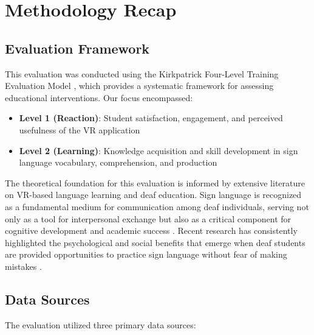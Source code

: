\documentclass[12pt,a4paper]{article}
\begin{document}
\section{Methodology Recap}

\subsection{Evaluation Framework}

This evaluation was conducted using the Kirkpatrick Four-Level Training Evaluation Model \citep{xie2022virtual}, which provides a systematic framework for assessing educational interventions. Our focus encompassed:

\begin{itemize}
    \item \textbf{Level 1 (Reaction)}: Student satisfaction, engagement, and perceived usefulness of the VR application
    \item \textbf{Level 2 (Learning)}: Knowledge acquisition and skill development in sign language vocabulary, comprehension, and production
\end{itemize}

The theoretical foundation for this evaluation is informed by extensive literature on VR-based language learning and deaf education. Sign language is recognized as a fundamental medium for communication among deaf individuals, serving not only as a tool for interpersonal exchange but also as a critical component for cognitive development and academic success \citep{swanwick2015deaf, fidan2023perspectives}. Recent research has consistently highlighted the psychological and social benefits that emerge when deaf students are provided opportunities to practice sign language without fear of making mistakes \citep{alawajee2021influence}.

\subsection{Data Sources}

The evaluation utilized three primary data sources:
\end{document}
